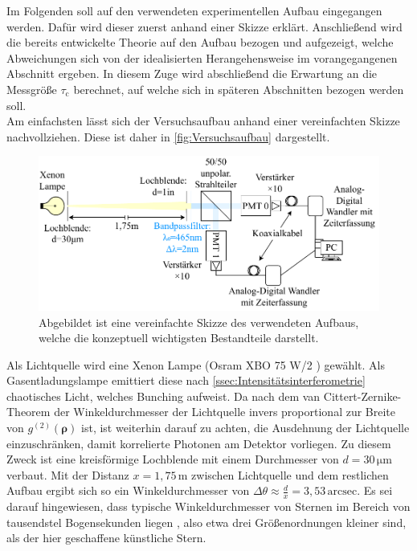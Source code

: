 Im Folgenden soll auf den verwendeten experimentellen Aufbau eingegangen werden. 
Dafür wird dieser zuerst anhand einer Skizze erklärt. 
Anschließend wird die bereits entwickelte Theorie auf den Aufbau bezogen und aufgezeigt, welche Abweichungen sich von der idealisierten Herangehensweise im vorangegangenen Abschnitt ergeben. 
In diesem Zuge wird abschließend die Erwartung an die Messgröße $\tau_{\mathrm{c}}$ berechnet, auf welche sich in späteren Abschnitten bezogen werden soll. \\

Am einfachsten lässt sich der Versuchsaufbau anhand einer vereinfachten Skizze nachvollziehen. Diese ist daher in \autoref{fig:Versuchsaufbau} dargestellt. 
\begin{figure}[h]
    \centering
    \includegraphics[width=0.9\linewidth]{images/Aufbau/Aufbau.pdf}
    \caption{Abgebildet ist eine vereinfachte Skizze des verwendeten Aufbaus, welche die konzeptuell wichtigsten Bestandteile darstellt.}
    \label{fig:Versuchsaufbau}
\end{figure}
Als Lichtquelle wird eine Xenon Lampe (Osram XBO 75 W/2 \cite{XBO75OSRAM}) gewählt. 
Als Gasentladungslampe emittiert diese nach \autoref{ssec:Intensitätsinterferometrie} chaotisches Licht, welches Bunching aufweist. 
Da nach dem van Cittert-Zernike-Theorem der Winkeldurchmesser der Lichtquelle invers proportional zur Breite von $g^{(2)}(\bm{\rho})$ ist, ist weiterhin darauf zu achten, die Ausdehnung der Lichtquelle einzuschränken, damit korrelierte Photonen am Detektor vorliegen. 
Zu diesem Zweck ist eine kreisförmige Lochblende mit einem Durchmesser von $d=30\,\mathrm{\mu m}$ verbaut. 
Mit der Distanz $x=1{,}75\,\mathrm{m}$ zwischen Lichtquelle und dem restlichen Aufbau ergibt sich so ein Winkeldurchmesser von $\Delta \theta \approx \frac{d}{x} = 3{,}53\,\mathrm{arcsec}$. 
Es sei darauf hingewiesen, dass typische Winkeldurchmesser von Sternen im Bereich von tausendstel Bogensekunden liegen \cite{hanburybrownAngularDiameters321974}, also etwa drei Größenordnungen kleiner sind, als der hier geschaffene \glqq künstliche Stern\grqq. \\
